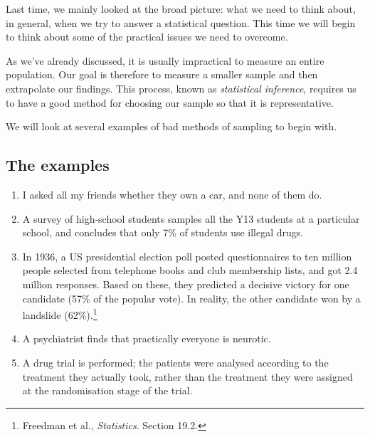 



Last time, we mainly looked at the broad picture: what we need to think about, in general, when we try to
answer a statistical question. This time we will begin to think about some of the practical issues we need
to overcome.

As we've already discussed, it is usually impractical to measure an entire population. Our goal is therefore
to measure a smaller sample and then extrapolate our findings. This process, known as \emph{statistical inference},
requires us to have a good method for choosing our sample so that it is representative.

We will look at several examples of bad methods of sampling to begin with.

\subsection*{The examples}
\begin{enumerate}
  \item I asked all my friends whether they own a car, and none of them do.
  \item A survey of high-school students samples all the Y13 students at a particular school, and concludes that only
        7\% of students use illegal drugs.
  \item In 1936, a US presidential election poll posted questionnaires to ten million people selected from telephone
        books and club membership lists, and got 2.4 million responses. Based on these, they predicted a decisive
        victory for one candidate (57\% of the popular vote). In reality, the other candidate won by a landslide (62\%).\footnote{Freedman et al., \emph{Statistics}. Section 19.2.}
  \item A psychiatrist finds that practically everyone is neurotic.
  \item A drug trial is performed; the patients were analysed according to the treatment they actually took, rather
        than the treatment they were assigned at the randomisation stage of the trial.
\end{enumerate}

